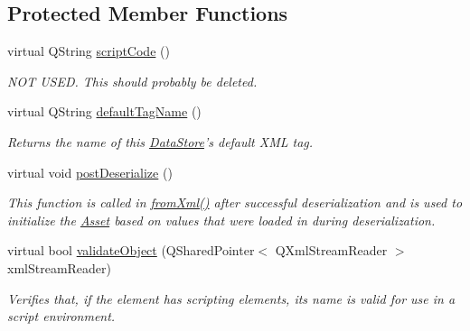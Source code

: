 \subsection*{Protected Member Functions}
\begin{DoxyCompactItemize}
\item 
\hypertarget{class_picto_1_1_scriptable_a8dbf0ff4a3aa13ed1f2adaec680940b7}{virtual Q\-String \hyperlink{class_picto_1_1_scriptable_a8dbf0ff4a3aa13ed1f2adaec680940b7}{script\-Code} ()}\label{class_picto_1_1_scriptable_a8dbf0ff4a3aa13ed1f2adaec680940b7}

\begin{DoxyCompactList}\small\item\em N\-O\-T U\-S\-E\-D. This should probably be deleted. \end{DoxyCompactList}\item 
virtual Q\-String \hyperlink{class_picto_1_1_scriptable_a45f74e86ce549cc38e07ac2697b3aa81}{default\-Tag\-Name} ()
\begin{DoxyCompactList}\small\item\em Returns the name of this \hyperlink{class_picto_1_1_data_store}{Data\-Store}'s default X\-M\-L tag. \end{DoxyCompactList}\item 
virtual void \hyperlink{class_picto_1_1_scriptable_a5d36462b3e5c89f0d6ae8fe466c1b060}{post\-Deserialize} ()
\begin{DoxyCompactList}\small\item\em This function is called in \hyperlink{class_picto_1_1_asset_a8bed4da09ecb1c07ce0dab313a9aba67}{from\-Xml()} after successful deserialization and is used to initialize the \hyperlink{class_picto_1_1_asset}{Asset} based on values that were loaded in during deserialization. \end{DoxyCompactList}\item 
\hypertarget{class_picto_1_1_scriptable_ab6e2944c43a3b5d418bf7b251594386d}{virtual bool \hyperlink{class_picto_1_1_scriptable_ab6e2944c43a3b5d418bf7b251594386d}{validate\-Object} (Q\-Shared\-Pointer$<$ Q\-Xml\-Stream\-Reader $>$ xml\-Stream\-Reader)}\label{class_picto_1_1_scriptable_ab6e2944c43a3b5d418bf7b251594386d}

\begin{DoxyCompactList}\small\item\em Verifies that, if the element has scripting elements, its name is valid for use in a script environment. \end{DoxyCompactList}\end{DoxyCompactItemize}
